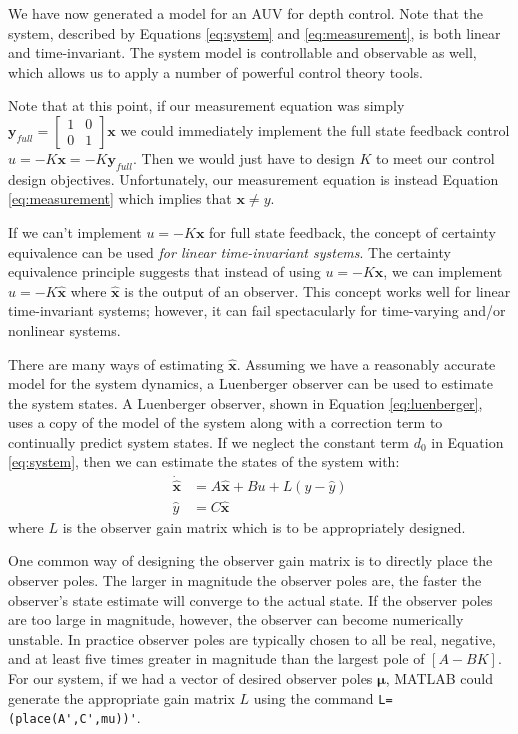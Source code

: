 \documentclass{article}
\begin{document}
We have now generated a model for an AUV for depth control.  Note that the system, described by Equations \ref{eq:system} and \ref{eq:measurement}, is both linear and time-invariant.  The system model is controllable and observable as well, which allows us to apply a number of powerful control theory tools.

Note that at this point, if our measurement equation was simply $\pmb{y}_{full}=\begin{bmatrix} 1 & 0 \\ 0 & 1 \end{bmatrix} \pmb{x}$ we could immediately implement the full state feedback control $u=-K\pmb{x}=-K\pmb{y}_{full}$.  Then we would just have to design $K$ to meet our control design objectives.  Unfortunately, our measurement equation is instead Equation \ref{eq:measurement} which implies that $\pmb{x}\neq y$.

If we can't implement $u=-K\pmb{x}$ for full state feedback, the concept of certainty equivalence can be used \emph{for linear time-invariant systems}.  The certainty equivalence principle suggests that instead of using $u=-K\pmb{x}$, we can implement $u=-K\pmb{\hat{x}}$ where $\pmb{\hat{x}}$ is the output of an observer.  This concept works well for linear time-invariant systems; however, it can fail spectacularly for time-varying and/or nonlinear systems.

There are many ways of estimating $\pmb{\hat{x}}$.  Assuming we have a reasonably accurate model for the system dynamics, a Luenberger observer can be used to estimate the system states.  A Luenberger observer, shown in Equation \ref{eq:luenberger}, uses a copy of the model of the system along with a correction term to continually predict system states.  If we neglect the constant term $d_0$ in Equation \ref{eq:system}, then we can estimate the states of the system with:
\begin{equation}
\begin{split}
\label{eq:luenberger}
\pmb{\dot{\hat{x}}}&=A\pmb{\hat{x}}+Bu+L(y-\hat{y}) \\
\hat{y}&=C\pmb{\hat{x}}
\end{split}
\end{equation}
where $L$ is the observer gain matrix which is to be appropriately designed.  

One common way of designing the observer gain matrix is to directly place the observer poles. The larger in magnitude the observer poles are, the faster the observer's state estimate will converge to the actual state.  If the observer poles are too large in magnitude, however, the observer can become numerically unstable.  In practice observer poles are typically chosen to all be real, negative, and at least five times greater in magnitude than the largest pole of $[A-BK]$.  For our system, if we had a vector of desired observer poles $\pmb{\mu}$, MATLAB could generate the appropriate gain matrix $L$ using the command \verb+L=(place(A',C',mu))'+.
\end{document}
